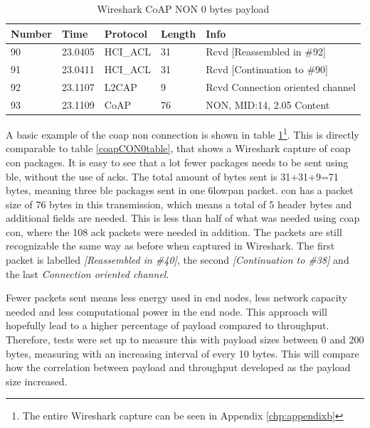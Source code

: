 \begin{table}[ht]
\small
\centering
\caption{Wireshark CoAP NON 0 bytes payload}
\label{coapNON0table}
\begin{tabular}{lllll}
\hline
Number & Time    & Protocol & Length & Info                             \\ \hline
90     & 23.0405 & HCI\_ACL & 31     & Rcvd {[}Reassembled in \#92{]}   \\
91     & 23.0411 & HCI\_ACL & 31     & Rcvd {[}Continuation to \#90{]}  \\
92     & 23.1107 & L2CAP    & 9      & Rcvd Connection oriented channel \\
93     & 23.1109 & CoAP     & 76     & NON, MID:14, 2.05 Content        \\ \hline
\end{tabular}
\end{table}


\noindent A basic example of the \gls{coap} \gls{non} connection is shown in table \ref{coapNON0table}\footnote{The entire Wireshark capture can be seen in Appendix \ref{chp:appendixb}}. This is directly comparable to table \ref{coapCON0table}, that shows a Wireshark capture of \gls{coap} \gls{con} packages. It is easy to see that a lot fewer packages needs to be sent using \gls{ble}, without the use of \glspl{ack}. The total amount of bytes sent is 31+31+9=71 bytes, meaning three \gls{ble} packages sent in one \gls{6lowpan} packet. \gls{con} has a packet size of 76 bytes in this transmission, which means a total of 5 header bytes and additional fields are needed. This is less than half of what was needed using \gls{coap} \gls{con}, where the 108 \gls{ack} packets were needed in addition. The packets are still recognizable the same way as before when captured in Wireshark. The first packet is labelled \textit{[Reassembled in \#40]}, the second \textit{[Continuation to \#38]} and the last \textit{Connection oriented channel}.

\noindent Fewer packets sent means less energy used in end nodes, less network capacity needed and less computational power in the end node. This approach will hopefully lead to a higher percentage of \gls{payload} compared to throughput. Therefore, tests were set up to measure this with \gls{payload} sizes between 0 and 200 bytes, measuring with an increasing interval of every 10 bytes. This will compare how the correlation between \gls{payload} and \gls{throughput} developed as the \gls{payload} size increased.

